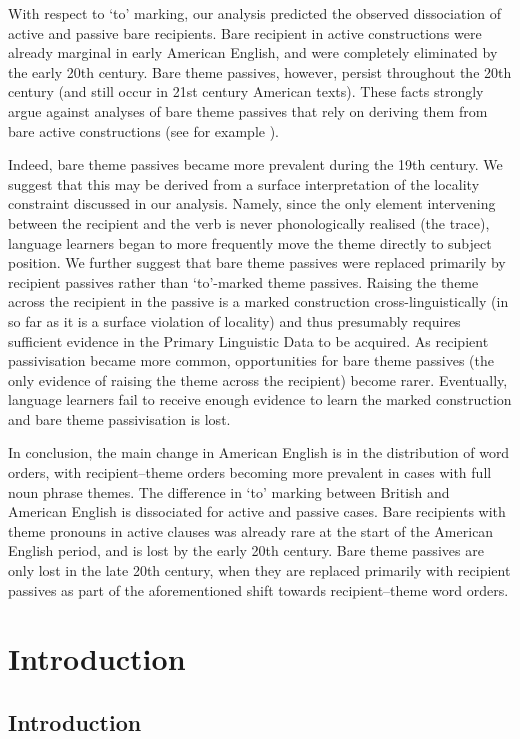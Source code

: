 With respect to `to' marking, our analysis predicted the observed dissociation of active and passive bare recipients. Bare recipient in active constructions were already marginal in early American English, and were completely eliminated by the early 20th century. Bare theme passives, however, persist throughout the 20th century (and still occur in 21st century American texts). These facts strongly argue against analyses of bare theme passives that rely on deriving them from bare active constructions (see for example \citet{Haddican.2010,Haddican.2011,Haddican.2012}).

Indeed, bare theme passives became more prevalent during the 19th century. We suggest that this may be derived from a surface interpretation of the locality constraint discussed in our analysis. Namely, since the only element intervening between the recipient and the verb is never phonologically realised (the trace), language learners began to more frequently move the theme directly to subject position. We further suggest that bare theme passives were replaced primarily by recipient passives rather than `to'-marked theme passives. Raising the theme across the recipient in the passive is a marked construction cross-linguistically (in so far as it is a surface violation of locality) and thus presumably requires sufficient evidence in the Primary Linguistic Data to be acquired. As recipient passivisation became more common, opportunities for bare theme passives (the only evidence of raising the theme across the recipient) become rarer. Eventually, language learners fail to receive enough evidence to learn the marked construction and bare theme passivisation is lost.

In conclusion, the main change in American English is in the distribution of word orders, with recipient--theme orders becoming more prevalent in cases with full noun phrase themes. The difference in `to' marking between British and American English is dissociated for active and passive cases. Bare recipients with theme pronouns in active clauses was already rare at the start of the American English period, and is lost by the early 20th century. Bare theme passives are only lost in the late 20th century, when they are replaced primarily with recipient passives as part of the aforementioned shift towards recipient--theme word orders.


\part{Introduction}
\chapter{Introduction}


